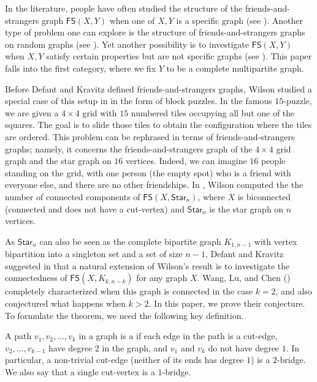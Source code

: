\documentclass{mystyle}
\newcommand{\FS}{\mathsf{FS}}
\begin{document}
In the literature, people have often studied the structure of the friends-and-strangers graph $\FS(X, Y)$ when one of $X, Y$ is a specific graph (see \cite{wilson1974, defant2022, lee2022, jeong2022, wang2023, wang2023b, brunck2023}). Another type of problem one can explore is the structure of friends-and-strangers graphs on random graphs (see \cite{alon2023, milojevic2022, wang2023c}). Yet another possibility is to investigate $\FS(X, Y)$ when $X, Y$ satisfy certain properties but are not specific graphs (see \cite{alon2023,bangachev2022,defant2021,defant2022,jeong2023}). This paper falls into the first category, where we fix $Y$ to be a complete multipartite graph. 

Before Defant and Kravitz defined friends-and-strangers graphs, Wilson studied a special case of this setup in \cite{wilson1974} in the form of block puzzles. In the famous $15$-puzzle, we are given a $4 \times 4$ grid with $15$ numbered tiles occupying all but one of the squares. The goal is to slide those tiles to obtain the configuration where the tiles are ordered. This problem can be rephrased in terms of friends-and-strangers graphs; namely, it concerns the friends-and-strangers graph of the $4 \times 4$ grid graph and the star graph on $16$ vertices. Indeed, we can imagine $16$ people standing on the grid, with one person (the empty spot) who is a friend with everyone else, and there are no other friendships. In \cite{wilson1974}, Wilson computed the the number of connected components of $\FS(X, \mathsf{Star}_{n})$, where $X$ is biconnected (connected and does not have a cut-vertex) and $\mathsf{Star}_{n}$ is the star graph on $n$ vertices. 

As $\mathsf{Star}_{n}$ can also be seen as the complete bipartite graph $K_{1, n-1}$ with vertex bipartition into a singleton set and a set of size $n - 1$, Defant and Kravitz suggested in \cite{defant2021} that a natural extension of Wilson's result is to investigate the connectedness of $\FS(X, K_{k, n-k})$ for any graph $X$. Wang, Lu, and Chen (\cite{wang2023}) completely characterized when this graph is connected in the case $k = 2$, and also conjectured what happens when $k > 2$. In this paper, we prove their conjecture. To formulate the theorem, we need the following key definition.
\begin{definition}\label{def_bridge}
    A path $v_1, v_2, \ldots, v_k$ in a graph is a  if each edge in the path is a cut-edge, $v_2, \ldots, v_{k - 1}$ have degree $2$ in the graph, and $v_1$ and $v_k$ do not have degree $1$. In particular, a non-trivial cut-edge (neither of its ends has degree $1$) is a $2$-bridge. We also say that a single cut-vertex is a $1$-bridge.
\end{definition}
\end{document}
